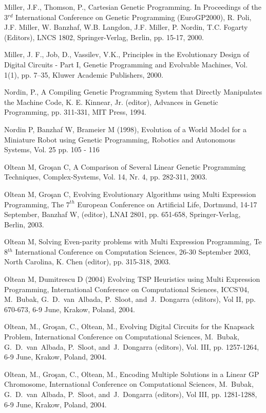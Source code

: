 \begin{thebibliography}{500}
Miller, J.F., Thomson, P., Cartesian Genetic Programming. In Proceedings of 
the 3$^{rd}$ International Conference on Genetic Programming (EuroGP2000), 
R. Poli, J.F. Miller, W. Banzhaf, W.B. Langdon, J.F. Miller, P. Nordin, T.C. 
Fogarty (Editors), LNCS 1802, Springer-Verlag, Berlin, pp. 15-17, 2000.

Miller, J. F., Job, D., Vassilev, V.K., Principles in the Evolutionary 
Design of Digital Circuits - Part I, Genetic Programming and Evolvable 
Machines, Vol. 1(1), pp. 7--35, Kluwer Academic Publishers, 2000.

Nordin, P., A Compiling Genetic Programming System that Directly Manipulates 
the Machine Code, K. E. Kinnear, Jr. (editor), Advances in Genetic 
Programming, pp. 311-331, MIT Press, 1994.

Nordin P, Banzhaf W, Brameier M (1998), Evolution of a World Model for a Miniature Robot using Genetic Programming, Robotics and Autonomous Systems, Vol. 25 pp. 105 - 116


Oltean M, Gro\c san C, A Comparison of Several Linear Genetic Programming Techniques, Complex-Systems, Vol. 14, Nr. 4, pp. 282-311, 2003.

Oltean M, Gro\c san C, Evolving Evolutionary Algorithms using Multi 
Expression Programming, The $7^{th}$ European Conference on Artificial Life, 
Dortmund, 14-17 September, Banzhaf W, (editor), LNAI 2801, pp. 651-658, Springer-Verlag, Berlin, 2003.

Oltean M, Solving Even-parity problems with Multi Expression Programming, 
Te 8$^{th}$ International Conference on Computation Sciences, 
26-30 September 2003, North Carolina, K. Chen (editor), pp. 315-318, 2003.

Oltean M, Dumitrescu D (2004) Evolving TSP Heuristics using Multi Expression Programming, International Conference on Computational Sciences, ICCS'04, M. Bubak, G. D. van Albada, P. Sloot, and J. Dongarra (editors), Vol II, pp. 670-673, 6-9 June, Krakow, Poland, 2004.

Oltean, M., Gro\c san, C., Oltean, M., Evolving Digital Circuits for the Knapsack Problem, International Conference on Computational Sciences, M. Bubak, G. D. van Albada, P. Sloot, and J. Dongarra (editors), Vol. III, pp. 1257-1264, 6-9 June, Krakow, Poland, 2004.

Oltean, M., Gro\c san, C., Oltean, M., Encoding Multiple Solutions in a Linear GP Chromosome, International Conference on Computational Sciences, M. Bubak, G. D. van Albada, P. Sloot, and J. Dongarra (editors), Vol III, pp. 1281-1288, 6-9 June, Krakow, Poland, 2004.


\end{thebibliography}
